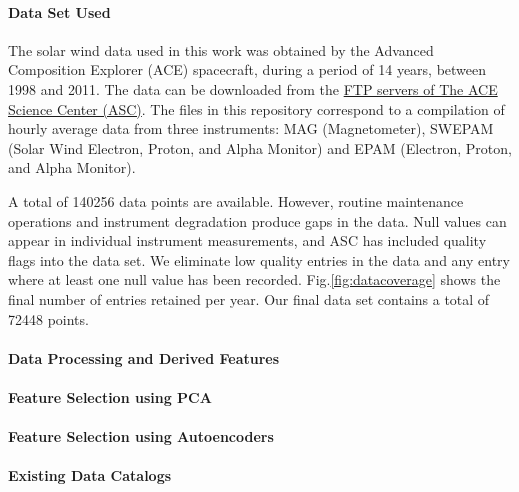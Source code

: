 \paragraph{Data Set Used}
The solar wind data used in this work was obtained by the Advanced Composition Explorer (ACE) spacecraft, during a period of 14 years, between 1998 and 2011. The data can be downloaded from the \href{ftp://mussel.srl.caltech.edu/pub/ace/level2/multi}{FTP servers of The ACE Science Center (ASC)}. The files in this repository correspond to a compilation of hourly average data from three instruments: MAG (Magnetometer), SWEPAM (Solar Wind Electron, Proton, and Alpha Monitor) and EPAM (Electron, Proton, and Alpha Monitor).

A total of 140256 data points are available. However, routine maintenance operations and instrument degradation produce gaps in the data. Null values can appear in individual instrument measurements, and ASC has included quality flags into the data set. We eliminate low quality entries in the data and any entry where at least one null value has been recorded. Fig.\ref{fig:datacoverage} shows the final number of entries retained per year. Our final data set contains a total of 72448 points.

\paragraph{Data Processing and Derived Features}

\paragraph{Feature Selection using PCA}

\paragraph{Feature Selection using Autoencoders}

\paragraph{Existing Data Catalogs}